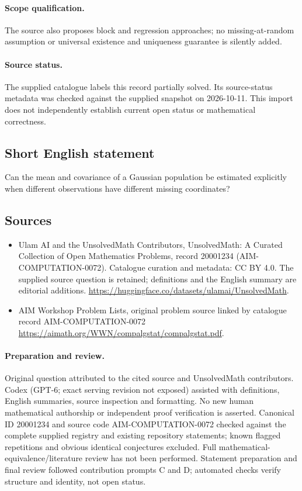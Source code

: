 \documentclass[11pt]{article}
\begin{document}
\paragraph{Scope qualification.}
The source also proposes block and regression approaches; no missing-at-random assumption or universal existence and uniqueness guarantee is silently added.
\paragraph{Source status.}
The supplied catalogue labels this record partially solved. Its source-status metadata was checked against the supplied snapshot on 2026-10-11. This import does not independently establish current open status or mathematical correctness.
\subsection{Short English statement}
Can the mean and covariance of a Gaussian population be estimated explicitly when different observations have different missing coordinates?
\subsection{Sources}
\begin{itemize}
\item[S1] Ulam AI and the UnsolvedMath Contributors, UnsolvedMath: A Curated Collection of Open Mathematics Problems, record 20001234 (AIM-COMPUTATION-0072). Catalogue curation and metadata: CC BY 4.0. The supplied source question is retained; definitions and the English summary are editorial additions.
\url{https://huggingface.co/datasets/ulamai/UnsolvedMath}.
\item[S2] AIM Workshop Problem Lists, original problem source linked by catalogue record AIM-COMPUTATION-0072
\url{https://aimath.org/WWN/compalgstat/compalgstat.pdf}.
\end{itemize}
\paragraph{Preparation and review.}
Original question attributed to the cited source and UnsolvedMath contributors. Codex (GPT-6; exact serving revision not exposed) assisted with definitions, English summaries, source inspection and formatting. No new human mathematical authorship or independent proof verification is asserted. Canonical ID 20001234 and source code AIM-COMPUTATION-0072 checked against the complete supplied registry and existing repository statements; known flagged repetitions and obvious identical conjectures excluded. Full mathematical-equivalence/literature review has not been performed. Statement preparation and final review followed contribution prompts C and D; automated checks verify structure and identity, not open status.
\label{end:20001234}
\end{document}
